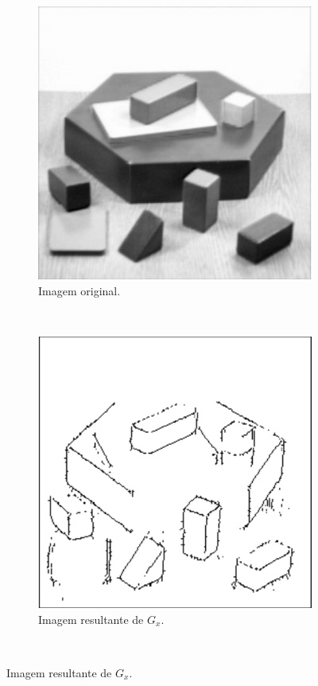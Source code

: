 \begin{figure}[H]
    \caption{Segmentação com operador Sobel.}
    \centering
    \label{segment:fig:7}
    \begin{subfigure}[t]{0.45\textwidth}
        \centering
        \includegraphics[width=1\linewidth]{recursos/imagens/image_seg/o1.png}
        \caption{Imagem original.}
        \label{segment:fig:7.1}
    \end{subfigure}%
    ~ 
    \begin{subfigure}[t]{0.45\textwidth}
        \centering
        \includegraphics[width=1\linewidth]{recursos/imagens/image_seg/o2.png}
        \caption{Imagem resultante de $G_x$.}
        \label{segment:fig:7.2}
    \end{subfigure}%
    ~ 
    

\end{figure}

